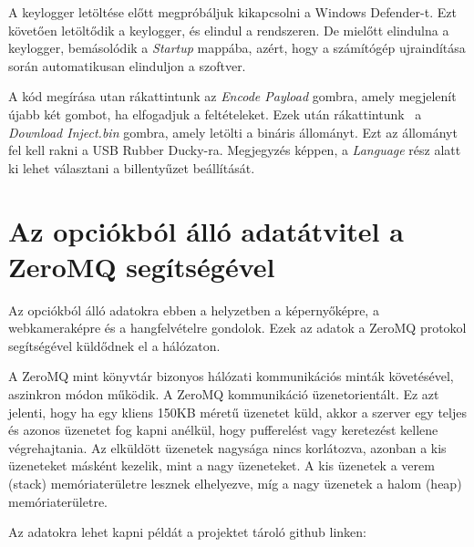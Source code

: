 \documentclass[12pt,a4paper,oneside]{report}
\begin{document}
A keylogger letöltése előtt megpróbáljuk kikapcsolni a Windows Defender-t. Ezt követően letöltődik a keylogger, és elindul a rendszeren. De mielőtt elindulna a keylogger, bemásolódik a \textit{Startup} mappába, azért, hogy a számítógép ujraindítása során automatikusan elinduljon a szoftver.

A kód megírása utan rákattintunk az \textit{Encode Payload} gombra, amely megjelenít újabb két gombot, ha elfogadjuk a feltételeket. Ezek után rákattintunk \ a \textit{Download Inject.bin} gombra, amely letölti a bináris állományt. Ezt az állományt fel kell rakni a USB Rubber Ducky-ra. Megjegyzés képpen, a \textit{Language} rész alatt ki lehet választani a billentyűzet beállítását.

\section{Az opciókból álló adatátvitel a ZeroMQ segítségével}
Az opciókból álló adatokra ebben a helyzetben a képernyőképre, a webkameraképre és a hangfelvételre gondolok. Ezek az adatok a ZeroMQ protokol segítségével küldődnek el a hálózaton.

A ZeroMQ mint könyvtár bizonyos hálózati kommunikációs minták követésével, aszinkron módon működik. A ZeroMQ kommunikáció üzenetorientált. Ez azt jelenti, hogy ha egy kliens 150KB méretű üzenetet küld, akkor a szerver egy teljes és azonos üzenetet fog kapni anélkül, hogy pufferelést vagy keretezést kellene végrehajtania. Az elküldött üzenetek nagysága nincs korlátozva, azonban a kis üzeneteket másként kezelik, mint a nagy üzeneteket. A kis üzenetek a verem (stack) memóriaterületre lesznek elhelyezve, míg a nagy üzenetek a halom (heap) memóriaterületre.

Az adatokra lehet kapni példát a projektet tároló github linken: \cite{github} %
\end{document}
